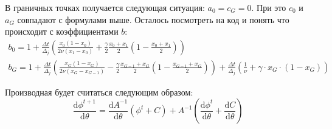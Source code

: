 \documentclass[10pt]{article}
\theoremstyle{plain}
\theoremstyle{remark}
\begin{document}
\begin{itemize}
\begin{itemize}
    В граничных точках получается следующая ситуация: $a_0 = c_G = 0$. При это $c_0$ и $a_G$ совпадают с формулами выше. Осталось посмотреть на код и понять 
    что происходит с коэффициентами $b$:
    \begin{gather*}
      b_0 = 1 + \frac{\Delta t}{\Delta_j} \left(\frac{x_0 (1 - x_0)}{2\nu(x_1 - x_0)} + \frac{\gamma}{2} \frac{x_0 + x_1}{2} \left(1 - \frac{x_0 + x_1}{2}\right) \right) \\
      b_G = 1 + \frac{\Delta t}{\Delta_j} \left(\frac{x_G(1 - x_G)}{2\nu (x_G - x_{G - 1})} - \frac{\gamma}{2} \frac{x_{G - 1} + x_G}{2} \left(1 - \frac{x_{G - 1} + x_G}{2} \right)  \right)
      + \frac{\Delta t}{\Delta_j} \left(\frac{1}{\nu} + \gamma \cdot x_G \cdot (1 - x_G) \right)
    \end{gather*}

    Производная будет считаться следующим образом:
    \begin{equation*}
      \frac{\mathrm{d} \phi^{t + 1}}{\mathrm{d} \theta} = \frac{\mathrm{d}A^{-1}}{\mathrm{d}\theta} (\phi^t + C) + A^{-1} \left(\frac{\mathrm{d}\phi^t}{\mathrm{d} \theta} + \frac{\mathrm{d} C}{\mathrm{d} \theta} \right)
    \end{equation*}
  \end{itemize}

\end{itemize}
\end{document}
